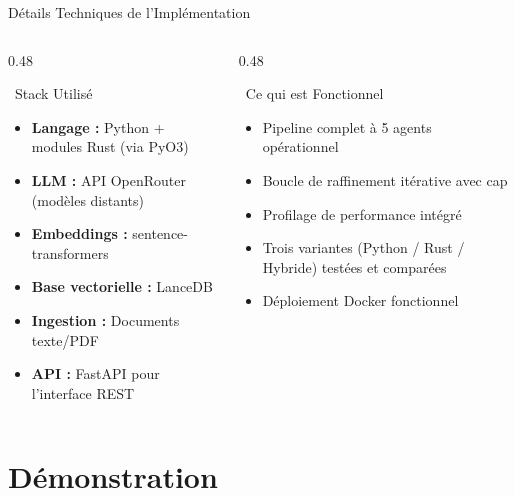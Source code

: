 \documentclass[aspectratio=169]{beamer}
\begin{document}
\begin{frame}{Détails Techniques de l'Implémentation}
  \begin{columns}[T]
    \begin{column}{0.48\textwidth}
      \begin{block}{\faPython\ Stack Utilisé}
        \small
        \begin{itemize}
          \item \textbf{Langage :} Python + modules Rust (via PyO3)
          \item \textbf{LLM :} API OpenRouter (modèles distants)
          \item \textbf{Embeddings :} sentence-transformers
          \item \textbf{Base vectorielle :} LanceDB
          \item \textbf{Ingestion :} Documents texte/PDF
          \item \textbf{API :} FastAPI pour l'interface REST
        \end{itemize}
      \end{block}
    \end{column}
    \begin{column}{0.48\textwidth}
      \begin{exampleblock}{\faCheckCircle\ Ce qui est Fonctionnel}
        \small
        \begin{itemize}
          \item Pipeline complet à 5 agents opérationnel
          \item Boucle de raffinement itérative avec cap
          \item Profilage de performance intégré
          \item Trois variantes (Python / Rust / Hybride) testées et comparées
          \item Déploiement Docker fonctionnel
        \end{itemize}
      \end{exampleblock}
    \end{column}
  \end{columns}
\end{frame}

\section{Démonstration}
\end{document}
